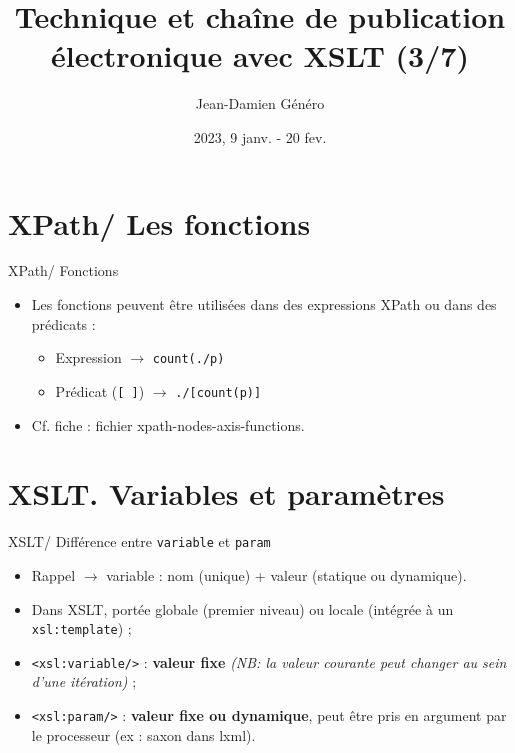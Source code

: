 \documentclass{beamer}
\title{Technique et chaîne de publication électronique avec XSLT (3/7)}
\date{2023, 9 janv. - 20 fev.}
\author{Jean-Damien Généro}
\institute{École nationale des chartes -- M2 TNAH}
\begin{document}
    \maketitle
    
    \section{XPath/ Les fonctions}

    \begin{frame}{XPath/ Fonctions}
        \Large
        \begin{itemize}
            \item Les fonctions peuvent être utilisées dans des expressions XPath ou dans des prédicats :
            \begin{itemize}
            \Large
                \item Expression $\rightarrow$ \texttt{count(./p)}
                \item Prédicat (\texttt{[ ]}) $\rightarrow$ \texttt{./[count(p)]}
            \end{itemize}
            \bigskip
            \item Cf. fiche : fichier xpath-nodes-axis-functions.
        \end{itemize}
    \end{frame}
    
    \section{XSLT. Variables et paramètres}

    \begin{frame}{XSLT/ Différence entre \texttt{variable} et \texttt{param}}
        \Large
        \begin{itemize}
            \item Rappel $\rightarrow$ variable : nom (unique) + valeur (statique ou dynamique).
            \bigskip
            \item Dans XSLT, portée globale (premier niveau) ou locale (intégrée à un \texttt{xsl:template}) ;
            \bigskip
            \item \texttt{<xsl:variable/>} : \textbf{valeur fixe} \textit{(NB: la valeur courante peut changer au sein d'une itération)} ;
            \bigskip
            \item \texttt{<xsl:param/>} : \textbf{valeur fixe ou dynamique}, peut être pris en argument par le processeur (ex : saxon dans lxml).
        \end{itemize}
    \end{frame}
\end{document}
